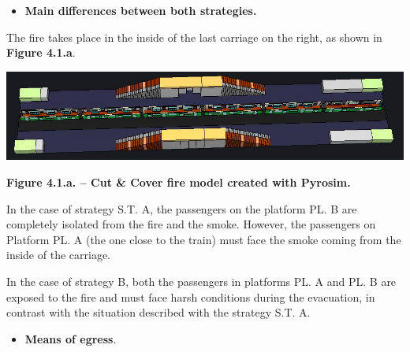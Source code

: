 \documentclass{article}
\begin{document}
\begin{itemize}[noitemsep,topsep=\mdcompacttopsep]%

\item{}\textbf{Main differences between both strategies.}%
\end{itemize}%

\noindent{}The fire takes place in the inside of the last carriage on the right, as shown 
in \textbf{Figure 4.1.a}.%

\begin{mdcenter}%

\noindent{}\includegraphics[keepaspectratio=true,width=\dimmin{}{\dimwidth{0.80}}]{images/Fig-4.1.a}{}%
\end{mdcenter}%

\begin{mdcenter}%

\noindent{}\textbf{Figure 4.1.a. – Cut \& Cover fire model created with Pyrosim.}%
\end{mdcenter}%

\noindent{}In the case of strategy S.T. A, the passengers on the platform PL. B are completely 
isolated from the fire and the smoke. However, the passengers on Platform PL. A 
(the one close to the train) must face the smoke coming from the inside of the 
carriage.%

In the case of strategy B, both the passengers in platforms PL. A and PL. B are exposed 
to the fire and must face harsh conditions during the evacuation, in contrast with 
the situation described with the strategy S.T. A.%

\begin{itemize}[noitemsep,topsep=\mdcompacttopsep]%

\item{}\textbf{Means of egress}.%
\end{itemize}%
\end{document}
